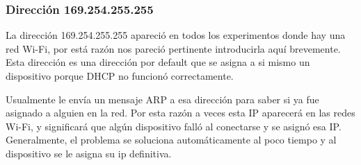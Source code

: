 \subsubsection{Dirección 169.254.255.255}

La dirección 169.254.255.255 apareció en todos los experimentos donde hay una red Wi-Fi, por está razón nos pareció pertinente introducirla aquí brevemente. Esta dirección es una dirección por default que se asigna a si mismo un dispositivo porque DHCP no funcionó correctamente.

Usualmente le envía un mensaje ARP a esa dirección para saber si ya fue asignado a alguien en la red. Por esta razón a veces esta IP aparecerá en las redes Wi-Fi, y significará que algún dispositivo falló al conectarse y se asignó esa IP. Generalmente, el problema se soluciona automáticamente al poco tiempo y al dispositivo se le asigna su ip definitiva.



